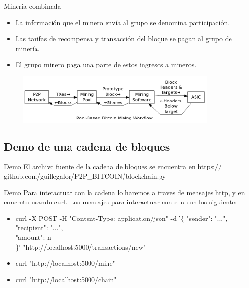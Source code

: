 \documentclass[compress,brown,xcolor=table]{beamer}
\begin{document}
\begin{frame}{Minería combinada}

\begin{itemize}
	\item La información que el minero envía al grupo se denomina participación.
	\item Las tarifas de recompensa y transacción del bloque se pagan al grupo de minería.
	\item El grupo minero paga una parte de estos ingresos a mineros.
\end{itemize}

\begin{figure}[h]
	\includegraphics[width=10cm]{../images/Image6.png}
	\centering		
\end{figure}

\end{frame}

\subsection{Demo de una cadena de bloques}
\frame{\sectionpage}

\begin{frame}{Demo}
	El archivo fuente de la cadena de bloques se encuentra en https://	github.com/guillegalor/P2P\_BITCOIN/blockchain.py
\end{frame}

\begin{frame}{Demo}
	Para interactuar con la cadena lo haremos a traves de mensajes http, y en concreto usando curl. Los mensajes para interactuar con ella son los siguiente:
	\begin{itemize}
	\item curl -X POST -H "Content-Type: application/json" -d '$\{$
 "sender": "...",\\
 "recipient": "...",\\
 "amount": n\\
$\}$' "http://localhost:5000/transactions/new"
	\item curl "http://localhost:5000/mine"
	\item curl "http://localhost:5000/chain"
		
\end{itemize}
\end{frame}
\end{document}
